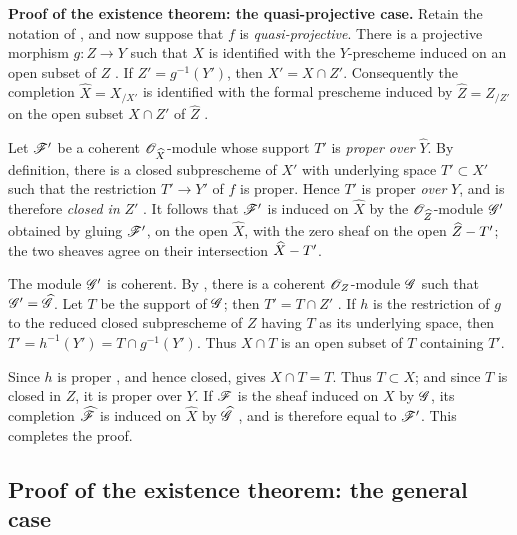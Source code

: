 \begin{env}[5.2.6]
\label{III.5.2.6}
\textbf{Proof of the existence theorem: the quasi-projective case.}
Retain the notation of , and now suppose that $f$
is \emph{quasi-projective}.  There is a projective morphism
$g:Z\to Y$ such that $X$ is identified with the $Y$-prescheme
induced on an open subset of $Z$ .  If
$Z'=g^{-1}(Y')$, then $X'=X\cap Z'$.  Consequently the completion
$\widehat{X}=X_{/X'}$ is identified with the formal prescheme
induced by $\widehat{Z}=Z_{/Z'}$ on the open subset $X\cap Z'$ of
$\widehat{Z}$ .

Let $\mathscr{F}'$ be a coherent $\mathscr{O}_{\widehat{X}}$-module whose
support $T'$ is \emph{proper over} $\widehat{Y}$.  By definition, there
is a closed subprescheme of $X'$ with underlying space
$T'\subset X'$ such that the restriction $T'\to Y'$ of $f$ is
proper.  Hence $T'$ is proper \emph{over} $Y$, and is therefore \emph{closed in}
$Z'$ .  It follows that $\mathscr{F}'$ is induced
on $\widehat{X}$ by the $\mathscr{O}_{\widehat{Z}}$-module $\mathscr{G}'$
obtained by gluing $\mathscr{F}'$, on the open $\widehat{X}$, with the
zero sheaf on the open $\widehat Z- T'$; the two sheaves agree on
their intersection $\widehat X- T'$.

The module $\mathscr{G}'$ is coherent.  By , there is a
coherent $\mathscr{O}_Z$-module $\mathscr{G}$ such that
$\mathscr{G}'=\widehat{\mathscr{G}}$.  Let $T$ be the support of $\mathscr{G}$;
then $T'=T\cap Z'$ .  If $h$ is the restriction
of $g$ to the reduced closed subprescheme of $Z$ having $T$ as
its underlying space, then $T'=h^{-1}(Y')=T\cap g^{-1}(Y')$.
Thus $X\cap T$ is an open subset of $T$ containing $T'$.

Since $h$ is proper , and hence closed,
 gives $X\cap T=T$.  Thus $T\subset X$; and
since $T$ is closed in $Z$, it is proper over $Y$.  If $\mathscr{F}$ is
the sheaf induced on $X$ by $\mathscr{G}$, its completion
$\widehat{\mathscr{F}}$ is induced on $\widehat{X}$ by
$\widehat{\mathscr{G}}$ , and is therefore equal to
$\mathscr{F}'$.  This completes the proof.
\end{env}


\subsection{Proof of the existence theorem: the general case}
\label{subsection:III.5.3}


